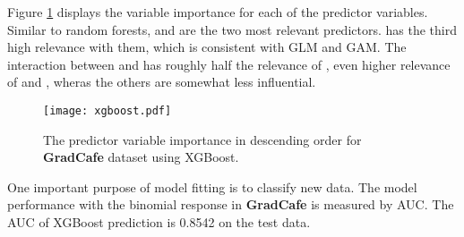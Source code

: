 Figure \ref{fig: xgb} displays the variable importance for each of the predictor variables. Similar to random forests,  and  are the two most relevant predictors.  has the third high relevance with them, which is consistent with GLM and GAM. The interaction between  and  has roughly half the relevance of , even  higher relevance of  and , wheras the others are somewhat less influential.  \\
\begin{figure}[h]
    \centering
    \texttt{[image: xgboost.pdf]}
    \caption{The predictor variable importance in descending order for \textbf{GradCafe} dataset using XGBoost.  }
    \label{fig: xgb}
\end{figure}
One important purpose of model fitting is to classify new data. The model performance with the binomial response in \textbf{GradCafe} is measured by AUC. The AUC of XGBoost prediction is 0.8542 on the test data. \\
